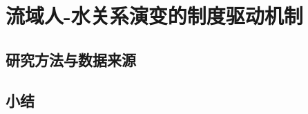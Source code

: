 \chapter{流域人-水关系演变的制度驱动机制}\label{cha:5}


\section{研究方法与数据来源}\label{ch5:methods}






\section{小结}\label{ch5:summary}

